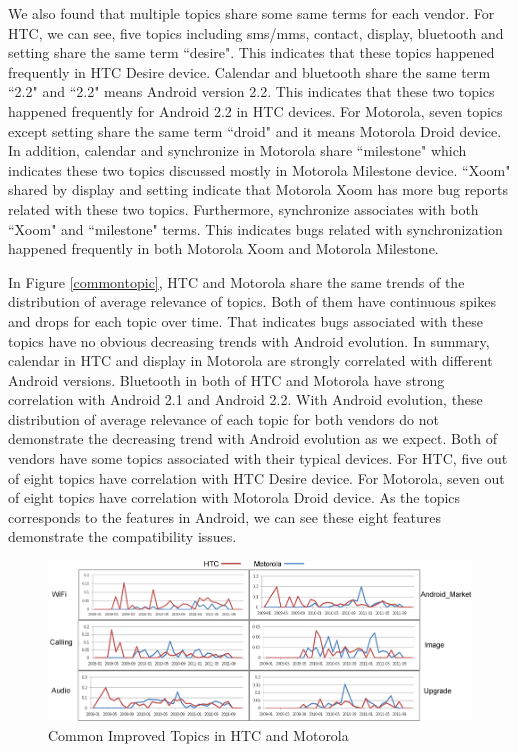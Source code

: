 \documentclass[10pt, conference, compsocconf]{IEEEtran}
\begin{document}
We also found that multiple topics share some same terms for each vendor. For HTC, we can see, five topics including sms/mms, contact, display, bluetooth and setting share the same term ``desire". This indicates that these topics happened frequently in HTC Desire device. Calendar and bluetooth share the same term ``2.2" and ``2.2" means Android version 2.2. This indicates that these two topics happened frequently for Android 2.2 in HTC devices. For Motorola, seven topics except setting share the same term ``droid" and it means Motorola Droid device. In addition, calendar and synchronize in Motorola share ``milestone" which indicates these two topics discussed mostly in Motorola Milestone device. ``Xoom" shared by display and setting indicate that Motorola Xoom has more bug reports related with these two topics. Furthermore, synchronize associates with both ``Xoom" and ``milestone" terms. This indicates bugs related with synchronization happened frequently in both Motorola Xoom and Motorola Milestone. 

In Figure \ref{commontopic}, HTC and Motorola share the same trends of the distribution of average relevance of topics. Both of them have continuous spikes and drops for each topic over time. That indicates bugs associated with these topics have no obvious decreasing trends with Android evolution.
In summary, calendar in HTC and display in Motorola are strongly correlated with different Android versions. Bluetooth in both of HTC and Motorola have strong correlation with Android 2.1 and Android 2.2. With Android evolution, these distribution of average relevance of each topic for both vendors do not demonstrate the decreasing trend with Android evolution as we expect. Both of vendors have some topics associated with their typical devices. For HTC, five out of eight topics have correlation with HTC Desire device. For Motorola, seven out of eight topics have correlation with Motorola Droid device. As the topics corresponds to the features in Android, we can see these eight features demonstrate the compatibility issues.

\begin{figure}[htb]
\centering
\includegraphics[width=1\textwidth]{fixtopic.png}
\caption{Common Improved Topics in HTC and Motorola}
\label{fixtopic}
\end{figure}
\end{document}
